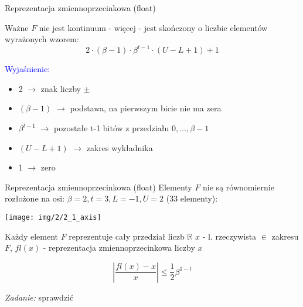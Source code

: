 \begin{frame}{Reprezentacja zmiennoprzecinkowa (float)}
    \begin{block}{Ważne}
    $F$ nie jest kontinuum - więcej - jest skończony o liczbie elementów wyrażonych wzorem:
    \[
    2 \cdot \left(\beta - 1 \right) \cdot \beta^{t-1} \cdot \left( U - L + 1 \right) + 1
    \]
    \begin{flushright}
    \end{flushright}
    \end{block}
    \textcolor{blue}{Wyjaśnienie:}
    \begin{itemize}
    	\item 2 $\rightarrow$ znak liczby $\pm$
    	\item  $(\beta - 1)$ $\rightarrow$ podstawa, na pierwszym bicie nie ma zera
    	\item $\beta^{t-1}$ $\rightarrow$ pozostałe t-1 bitów z przedziału ${0,\dots,\beta-1}$
    	\item $(U - L + 1)$ $\rightarrow$ zakres wykładnika
    	\item 1 $\rightarrow$ zero
    \end{itemize}
    
\end{frame}
\begin{frame}{Reprezentacja zmiennoprzecinkowa (float)}
    Elementy $F$ nie są równomiernie rozłożone na osi:
    $\beta = 2, t = 3, L = -1, U = 2$ \hspace{5mm} (33 elementy):
    \begin{center}
    \texttt{[image: img/2/2\_1\_axis]}
    \end{center}

    Każdy element $F$ reprezentuje cały przedział liczb $\mathbb{R}$\newline 
    $x$ - l. rzeczywista $\in$ zakresu $F$,\newline
    $fl(x)$ - reprezentacja zmiennoprzecinkowa liczby $x$

    \[
    \left| \frac{fl(x) - x}{x} \right| \le \frac{1}{2} \beta^{1-t}
    \]

    \begin{flushright}
        {\it Zadanie:} sprawdzić
    \end{flushright}
\end{frame}
